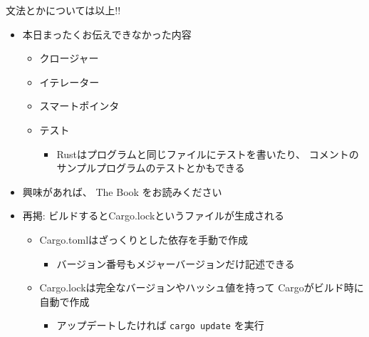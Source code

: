 \documentclass[cjk,dvipdfmx,10pt,compress,fragile%
hyperref={bookmarks=true,bookmarksnumbered=true,bookmarksopen=false,%
colorlinks=false,%
pdftitle={第 134 回 関西 Debian 勉強会},%
pdfauthor={小林},%
pdfsubject={資料},%
}]{beamer}
\begin{document}
\begin{frame}[t,fragile]{文法とかについては以上!!}
\begin{itemize}
 \item 本日まったくお伝えできなかった内容
       \begin{itemize}
	\item クロージャー
	\item イテレーター
	\item スマートポインタ
	\item テスト
	      \begin{itemize}
	       \item Rustはプログラムと同じファイルにテストを書いたり、
		     コメントのサンプルプログラムのテストとかもできる
	      \end{itemize}
       \end{itemize}
 \item 興味があれば、 The Book をお読みください
 \item 再掲: ビルドするとCargo.lockというファイルが生成される
       \begin{itemize}
	\item Cargo.tomlはざっくりとした依存を手動で作成
	      \begin{itemize}
	       \item バージョン番号もメジャーバージョンだけ記述できる
	      \end{itemize}
	\item Cargo.lockは完全なバージョンやハッシュ値を持って
	      Cargoがビルド時に自動で作成
	      \begin{itemize}
	       \item アップデートしたければ \verb|cargo update| を実行
	      \end{itemize}
       \end{itemize}
\end{itemize}
\end{frame}

\end{document}
